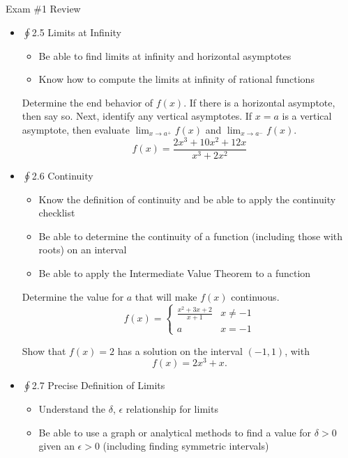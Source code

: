 \documentclass[cal1spr16Lectures.tex]{subfiles}
\begin{document}
\begin{frame}[allowframebreaks]{Exam \#1 Review}
\begin{itemize}
\begin{itemize}
	\end{itemize}
\framebreak
\item $\oint$2.5 Limits at Infinity
	\begin{itemize}\footnotesize
	\item Be able to find limits at infinity and horizontal asymptotes 
	\item Know how to compute the limits at infinity of rational functions
	\end{itemize}
\framebreak	
\begin{ex} Determine the end behavior of $f(x)$.  If there is a horizontal asymptote, then say so.  Next, identify any vertical asymptotes.  If $x=a$ is a vertical asymptote, then evaluate $\displaystyle\lim_{x\to a^+}f(x)$ and $\displaystyle\lim_{x\to a^-}f(x)$.
\[f(x)=\frac{2x^3+10x^2+12x}{x^3+2x^2}\]
\end{ex}
\framebreak
\item $\oint$2.6 Continuity 
	\begin{itemize}\footnotesize
	\item Know the definition of continuity and be able to apply the continuity checklist
	\item Be able to determine the continuity of a function (including those with roots) on an interval
	\item Be able to apply the Intermediate Value Theorem to a function
	\end{itemize}
\framebreak
\begin{ex} Determine the value for $a$ that will make $f(x)$ continuous. 
\[f(x)=\begin{cases}
	\frac{x^2+3x+2}{x+1} & x\neq -1 \\
	a & x=-1
	\end{cases}\]
\end{ex}
\begin{ex} Show that $f(x)=2$ has a solution on the interval $(-1,1)$, with
\[f(x)=2x^3+x.\]
\end{ex}
\framebreak
\item $\oint$2.7 Precise Definition of Limits 
	\begin{itemize}\footnotesize
	\item Understand the $\delta$, $\epsilon$ relationship for limits
	\item Be able to use a graph or analytical methods to find a value for $\delta>0$ given an $\epsilon>0$ (including finding symmetric intervals)
	\end{itemize}
\framebreak
\begin{ex}

\end{ex}
\end{itemize}
\end{frame}
\end{document}
